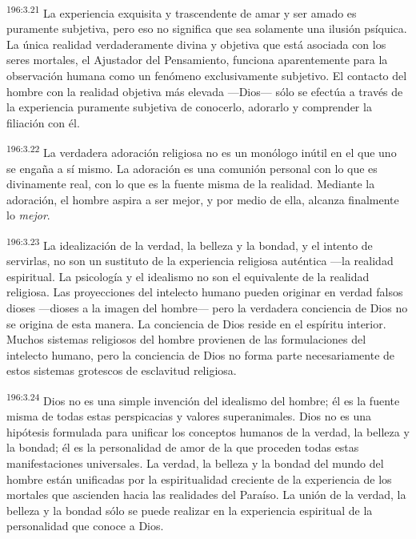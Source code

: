 \par 
\textsuperscript{196:3.21} La experiencia exquisita y trascendente de amar y ser amado es puramente subjetiva, pero eso no significa que sea solamente una ilusión psíquica. La única realidad verdaderamente divina y objetiva que está asociada con los seres mortales, el Ajustador del Pensamiento, funciona aparentemente para la observación humana como un fenómeno exclusivamente subjetivo. El contacto del hombre con la realidad objetiva más elevada ---Dios--- sólo se efectúa a través de la experiencia puramente subjetiva de conocerlo, adorarlo y comprender la filiación con él.

\par 
\textsuperscript{196:3.22} La verdadera adoración religiosa no es un monólogo inútil en el que uno se engaña a sí mismo. La adoración es una comunión personal con lo que es divinamente real, con lo que es la fuente misma de la realidad. Mediante la adoración, el hombre aspira a ser mejor, y por medio de ella, alcanza finalmente lo \textit{mejor}.

\par 
\textsuperscript{196:3.23} La idealización de la verdad, la belleza y la bondad, y el intento de servirlas, no son un sustituto de la experiencia religiosa auténtica ---la realidad espiritual. La psicología y el idealismo no son el equivalente de la realidad religiosa. Las proyecciones del intelecto humano pueden originar en verdad falsos dioses ---dioses a la imagen del hombre--- pero la verdadera conciencia de Dios no se origina de esta manera. La conciencia de Dios reside en el espíritu interior. Muchos sistemas religiosos del hombre provienen de las formulaciones del intelecto humano, pero la conciencia de Dios no forma parte necesariamente de estos sistemas grotescos de esclavitud religiosa.

\par 
\textsuperscript{196:3.24} Dios no es una simple invención del idealismo del hombre; él es la fuente misma de todas estas perspicacias y valores superanimales. Dios no es una hipótesis formulada para unificar los conceptos humanos de la verdad, la belleza y la bondad; él es la personalidad de amor de la que proceden todas estas manifestaciones universales. La verdad, la belleza y la bondad del mundo del hombre están unificadas por la espiritualidad creciente de la experiencia de los mortales que ascienden hacia las realidades del Paraíso. La unión de la verdad, la belleza y la bondad sólo se puede realizar en la experiencia espiritual de la personalidad que conoce a Dios.

